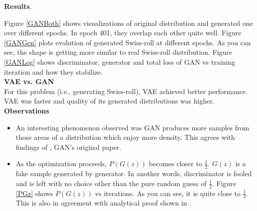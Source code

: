 \textbf{Results}. 

Figure \ref{GANBoth} shows visualizations of original distribution and generated one over different epochs. In epoch 401, they overlap each other quite well. Figure \ref{GANGen} plots evolution of generated Swiss-roll  at different epochs. As you can see, the shape is getting more similar to real Swiss-roll distribution. Figure \ref{GANLog} shows discriminator, generator and total loss of GAN vs training iteration and how they stabilize.\\

\textbf{VAE vs. GAN}\\ 
For this problem (i.e., generating Swiss-roll), VAE achieved better performance. VAE was faster and quality of its generated distributions was higher. \\

\textbf{Observations}
\begin{itemize}
\item An interesting phenomenon observed was GAN produces more samples from those areas of a distribution which enjoy more density. This agrees with findings of \cite{Goodfell}, GAN's original paper.
\item As the optimization proceeds, $P(G(z))$ becomes closer to $ \frac{1}{2}$. $G(z)$ is a fake sample generated by generator. In another words, discriminator is fooled and is left with no choice other than the pure random guess of $\frac{1}{2}$. Figure \ref{PGz} shows $P(G(z))$ vs iterations. As you can see, it is quite close to $\frac{1}{2}$. This is also in agreement with analytical proof shown in \cite{Goodfell}. 

\end{itemize}
 


